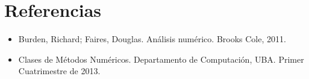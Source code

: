 \section{Referencias}

\begin{itemize}
  \item \nocite {Burden} Burden, Richard; Faires, Douglas. An\'alisis num\'erico. Brooks Cole, 2011.
  \item \nocite {MN} Clases de M\'etodos Num\'ericos. Departamento de Computaci\'on, UBA. Primer Cuatrimestre de 2013.
\end{itemize}
